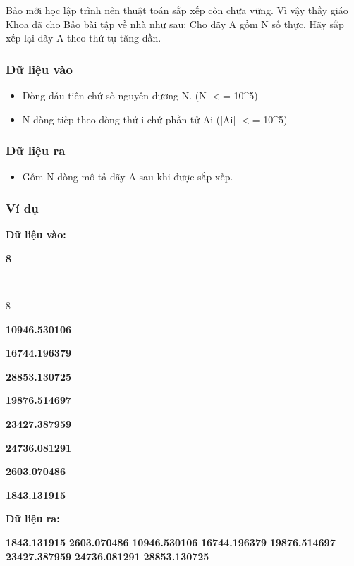 

Bảo mới học lập trình nên thuật toán sắp xếp còn chưa vững. Vì vậy thầy giáo Khoa đã cho Bảo bài tập về nhà như sau: Cho dãy A gồm N số thực. Hãy sắp xếp lại dãy A theo thứ tự tăng dần.

\subsubsection{Dữ liệu vào}
\begin{itemize}
	\item Dòng đầu tiên chứ số nguyên dương N. (N $<$= 10\textasciicircum5)
	\item N dòng tiếp theo dòng thứ i chứ phần tử Ai (|Ai| $<$= 10\textasciicircum5)
\end{itemize}

\subsubsection{Dữ liệu ra}
\begin{itemize}
	\item Gồm N dòng mô tả dãy A sau khi được sắp xếp.
\end{itemize}

\subsubsection{Ví dụ}

\textbf{Dữ liệu vào:}

\textbf{}\textbf{8}

\textbf{}

 

8 

\textbf{10946.530106 }

\textbf{16744.196379 }

\textbf{28853.130725 }

\textbf{19876.514697 }

\textbf{23427.387959 }

\textbf{24736.081291 }

\textbf{2603.070486 }

\textbf{1843.131915}\textbf{
}

\textbf{Dữ liệu ra:}

\textbf{
}\textbf{\textbf{1843.131915
}}\textbf{\textbf{2603.070486
}}\textbf{\textbf{10946.530106
}}\textbf{\textbf{16744.196379
}}\textbf{\textbf{19876.514697
}}\textbf{\textbf{23427.387959
}}\textbf{\textbf{24736.081291
}}\textbf{\textbf{28853.130725}}\textbf{
}

